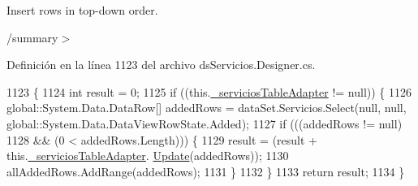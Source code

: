 Insert rows in top-\/down order. 

/summary$>$ 

Definición en la línea 1123 del archivo ds\-Servicios.\-Designer.\-cs.


\begin{DoxyCode}
1123                                                                                                            
                                      \{
1124             \textcolor{keywordtype}{int} result = 0;
1125             \textcolor{keywordflow}{if} ((this.\hyperlink{class_proyecto___integrador__3_1_1ds_servicios_table_adapters_1_1_table_adapter_manager_ac26b431a74f60f4ba1f8cc57cb5e75e2}{\_serviciosTableAdapter} != null)) \{
1126                 global::System.Data.DataRow[] addedRows = dataSet.Servicios.Select(null, null, 
      global::System.Data.DataViewRowState.Added);
1127                 \textcolor{keywordflow}{if} (((addedRows != null) 
1128                             && (0 < addedRows.Length))) \{
1129                     result = (result + this.\hyperlink{class_proyecto___integrador__3_1_1ds_servicios_table_adapters_1_1_table_adapter_manager_ac26b431a74f60f4ba1f8cc57cb5e75e2}{\_serviciosTableAdapter}.
      \hyperlink{class_proyecto___integrador__3_1_1ds_servicios_table_adapters_1_1_servicios_table_adapter_aeef3160a3e0bdc86f499f0f9ad7221fd}{Update}(addedRows));
1130                     allAddedRows.AddRange(addedRows);
1131                 \}
1132             \}
1133             \textcolor{keywordflow}{return} result;
1134         \}
\end{DoxyCode}
